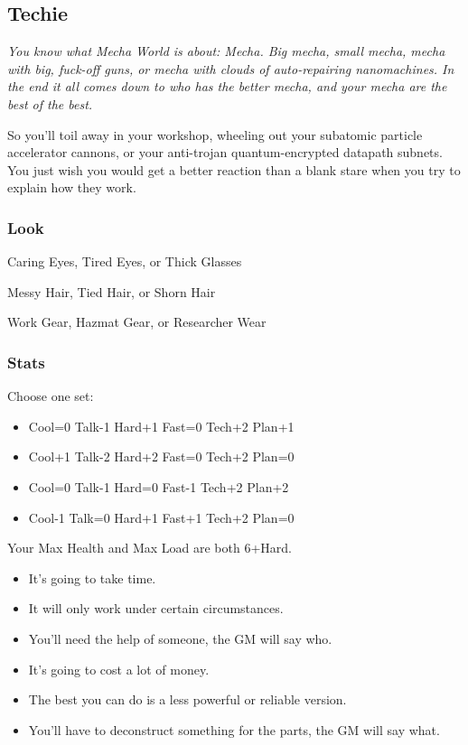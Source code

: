 \subsection{Techie}
{\itshape You know what Mecha World is about: Mecha. Big mecha, small
  mecha, mecha with big, fuck-off guns, or mecha with clouds of
  auto-repairing nanomachines. In the end it all comes down to who has
  the better mecha, and your mecha are the best of the best.

So you'll toil away in your workshop, wheeling out your subatomic
particle accelerator cannons, or your anti-trojan quantum-encrypted
datapath subnets. You just wish you would get a better reaction than a
blank stare when you try to explain how they work.}

\subsubsection{Look}

Caring Eyes, Tired Eyes, or Thick Glasses

Messy Hair, Tied Hair, or Shorn Hair

Work Gear, Hazmat Gear, or Researcher Wear

\subsubsection{Stats}
Choose one set:
\begin{itemize}
\setlength\itemsep{0em}
\item Cool=0 Talk-1 Hard+1 Fast=0 Tech+2 Plan+1
\item Cool+1 Talk-2 Hard+2 Fast=0 Tech+2 Plan=0
\item Cool=0 Talk-1 Hard=0 Fast-1 Tech+2 Plan+2
\item Cool-1 Talk=0 Hard+1 Fast+1 Tech+2 Plan=0
\end{itemize}

Your Max Health and Max Load are both 6+Hard.

\begin{itemize}
\item It's going to take time.
\item It will only work under certain circumstances.
\item You'll need the help of someone, the GM will say who.
\item It's going to cost a lot of money.
\item The best you can do is a less powerful or reliable version.
\item You’ll have to deconstruct something for the parts, the GM will say what.
\end{itemize}

